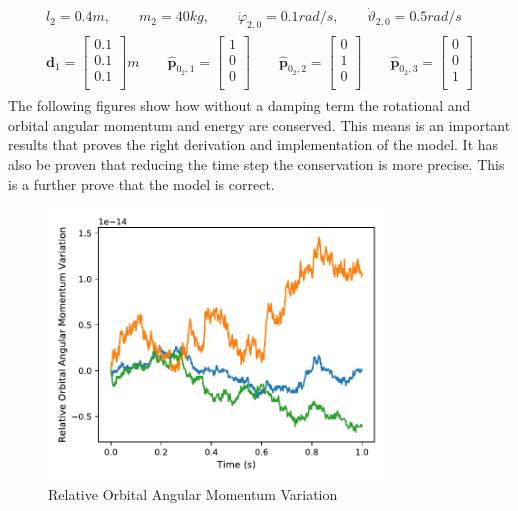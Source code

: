 \documentclass[]{BasiliskReportMemo}
\begin{document}
\begin{align}
\begin{split}
l_2=0.4 m, \qquad m_2=40 kg, \qquad \dot{\varphi}_{2,0}=0.1 rad/s, \qquad \dot{\vartheta}_{2,0}= 0.5 rad/s \\
\bm{d}_1=
\begin{bmatrix}
0.1 \\
0.1 \\
0.1\\
\end{bmatrix} m
\qquad
\bm{\hat{p}}_{0_2,1}=
\begin{bmatrix}
1 \\
0 \\
0\\
\end{bmatrix}
\qquad
\bm{\hat{p}}_{0_2,2}=
\begin{bmatrix}
0 \\
1 \\
0\\
\end{bmatrix}
\qquad
\bm{\hat{p}}_{0_2,3}=
\begin{bmatrix}
0 \\
0 \\
1 \\
\end{bmatrix}
\end{split}
\end{align}
The following figures show how without a damping term the rotational and orbital angular momentum and energy are conserved. This means is an important results that proves the right derivation and implementation of the model. It has also be proven that reducing the time step the conservation is more precise. This is a further prove that the model is correct. 
\begin{figure}[h]
		\centering
		\includegraphics[width=9cm]{Figures/OAM_time0001s.pdf}
		\caption{Relative Orbital Angular Momentum Variation}
		\label{fig:OAM001s}
	\end{figure} 
\end{document}
